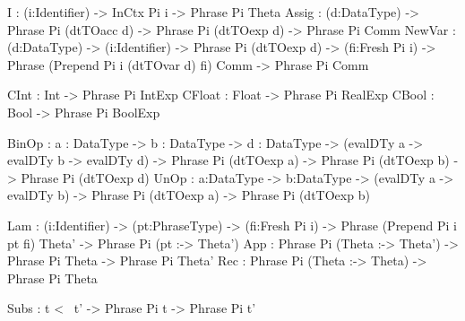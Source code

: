 \begin{code}
        I       : (i:Identifier) -> InCtx Pi i -> Phrase Pi Theta
        Assig   : (d:DataType) -> Phrase Pi (dtTOacc d) -> 
                  Phrase Pi (dtTOexp d) -> Phrase Pi Comm
        NewVar : (d:DataType) -> (i:Identifier) -> Phrase Pi (dtTOexp d) -> 
                 (fi:Fresh Pi i) -> Phrase (Prepend Pi i (dtTOvar d) fi) Comm -> 
                 Phrase Pi Comm
        
        CInt    : Int   -> Phrase Pi IntExp
        CFloat  : Float -> Phrase Pi RealExp
        CBool   : Bool  -> Phrase Pi BoolExp
        
        BinOp : {a : DataType} -> {b : DataType} -> {d : DataType} -> 
                (evalDTy a -> evalDTy b -> evalDTy d) -> 
                Phrase Pi (dtTOexp a) -> Phrase Pi (dtTOexp b) -> Phrase Pi (dtTOexp d)
        UnOp  : {a:DataType} -> {b:DataType} -> 
                (evalDTy a -> evalDTy b) -> 
                Phrase Pi (dtTOexp a)  -> Phrase Pi (dtTOexp b) 

        Lam   : (i:Identifier) -> (pt:PhraseType) -> (fi:Fresh Pi i) ->
                Phrase (Prepend Pi i pt fi) Theta' -> 
                Phrase Pi (pt :-> Theta')
        App    : Phrase Pi (Theta :-> Theta') -> Phrase Pi Theta -> 
                 Phrase Pi Theta'
        Rec    : Phrase Pi (Theta :-> Theta) -> Phrase Pi Theta
        
        Subs   : t <~ t' -> Phrase Pi t -> Phrase Pi t'


\end{code}
